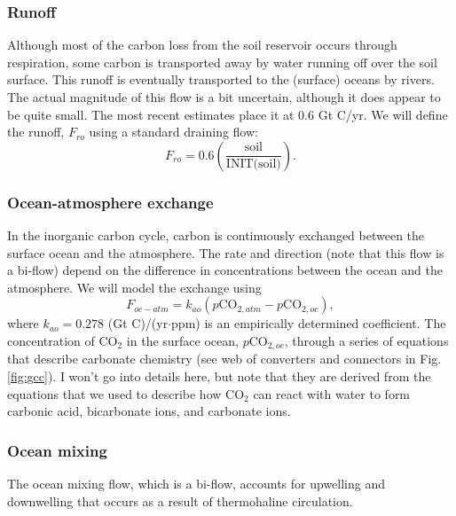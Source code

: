 \documentclass[11pt,letterpaper]{article}
\begin{document}
\subsubsection*{Runoff}
Although most of the carbon loss from the soil reservoir occurs through respiration, some carbon is transported away by water running off over the soil surface. This runoff is eventually transported to the (surface) oceans by rivers. The actual magnitude of this flow is a bit uncertain, although it does appear to be quite small. The most recent estimates place it at 0.6 Gt C/yr. We will define the runoff, $F_{ro}$ using a standard draining flow:
\begin{equation}
F_{ro} = 0.6\left(\frac{\mbox{soil}}{\mbox{INIT(soil)}}\right).
\end{equation}

\subsubsection*{Ocean-atmosphere exchange}
In the inorganic carbon cycle, carbon is continuously exchanged between the surface ocean and the atmosphere. The rate and direction (note that this flow is a bi-flow) depend on the difference in concentrations between the ocean and the atmosphere. We will model the exchange using
\begin{equation}
F_{oc-atm} = k_{ao}\left(p\mbox{CO}_{2,atm}-p\mbox{CO}_{2,oc}\right),
\end{equation}
where $k_{ao}=0.278$ (Gt C)/(yr$\cdot$ppm) is an empirically determined coefficient. The concentration of CO$_2$ in the surface ocean, $p\mbox{CO}_{2,oc}$, through a series of equations that describe carbonate chemistry (see web of converters and connectors in Fig. \ref{fig:gcc}). I won't go into details here, but note that they are derived from the equations that we used to describe how CO$_2$ can react with water to form carbonic acid, bicarbonate ions, and carbonate ions.

\subsubsection*{Ocean mixing}
The ocean mixing flow, which is a bi-flow, accounts for upwelling and downwelling that occurs as a result of thermohaline circulation.
\end{document}
